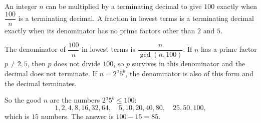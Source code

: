 An integer $n$ can be multiplied by a terminating decimal to give $100$ exactly when $\dfrac{100}{n}$ is a terminating decimal. A fraction in lowest terms is a terminating decimal exactly when its denominator has no prime factors other than $2$ and $5$.

The denominator of $\dfrac{100}{n}$ in lowest terms is $\dfrac{n}{\gcd(n,100)}$. If $n$ has a prime factor $p\ne2,5$, then $p$ does not divide $100$, so $p$ survives in this denominator and the decimal does not terminate. If $n=2^a5^b$, the denominator is also of this form and the decimal terminates.

So the good $n$ are the numbers $2^a5^b\le100$:
\[
1,2,4,8,16,32,64,\quad 5,10,20,40,80,\quad 25,50,100,
\]
which is $15$ numbers. The answer is $100-15=\boxed{85}$.
